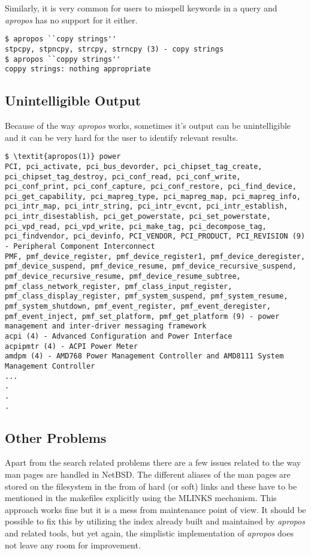 \documentclass[titlepage, a4paper, 12pt]{article}
\begin{document}
Similarly, it is very common for users to misspell keywords in a query and \textit{apropos} has no support for it either.
\begin{lstlisting}
$ apropos ``copy strings''
stpcpy, stpncpy, strcpy, strncpy (3) - copy strings
$ apropos ``coppy strings''
coppy strings: nothing appropriate
\end{lstlisting}

\subsection{Unintelligible Output}
Because of the way \textit{apropos} works, sometimes it's output can be
unintelligible and it can be very hard for the user to identify relevant results.

\begin{lstlisting}
$ \textit{apropos(1)} power
PCI, pci_activate, pci_bus_devorder, pci_chipset_tag_create,
pci_chipset_tag_destroy, pci_conf_read, pci_conf_write,
pci_conf_print, pci_conf_capture, pci_conf_restore, pci_find_device,
pci_get_capability, pci_mapreg_type, pci_mapreg_map, pci_mapreg_info,
pci_intr_map, pci_intr_string, pci_intr_evcnt, pci_intr_establish,
pci_intr_disestablish, pci_get_powerstate, pci_set_powerstate,
pci_vpd_read, pci_vpd_write, pci_make_tag, pci_decompose_tag,
pci_findvendor, pci_devinfo, PCI_VENDOR, PCI_PRODUCT, PCI_REVISION (9)
- Peripheral Component Interconnect
PMF, pmf_device_register, pmf_device_register1, pmf_device_deregister,
pmf_device_suspend, pmf_device_resume, pmf_device_recursive_suspend,
pmf_device_recursive_resume, pmf_device_resume_subtree,
pmf_class_network_register, pmf_class_input_register,
pmf_class_display_register, pmf_system_suspend, pmf_system_resume,
pmf_system_shutdown, pmf_event_register, pmf_event_deregister,
pmf_event_inject, pmf_set_platform, pmf_get_platform (9) - power
management and inter-driver messaging framework
acpi (4) - Advanced Configuration and Power Interface
acpipmtr (4) - ACPI Power Meter
amdpm (4) - AMD768 Power Management Controller and AMD8111 System
Management Controller
...
.
.
.
\end{lstlisting}
\subsection{Other Problems}
Apart from the search related problems there are a few issues related to
the way man pages are handled in NetBSD. The different aliases of the man pages
are stored on the filesystem in the from of hard (or soft) links and these
have to be mentioned in the makefiles explicitly using the MLINKS mechanism. This
approach works fine but it is a mess from maintenance point of view.
It should be possible to fix this by utilizing the index already built and
maintained by \textit{apropos} and related tools, but yet again, the
simplistic implementation of \textit{apropos} does not leave any room for
improvement.
\end{document}
